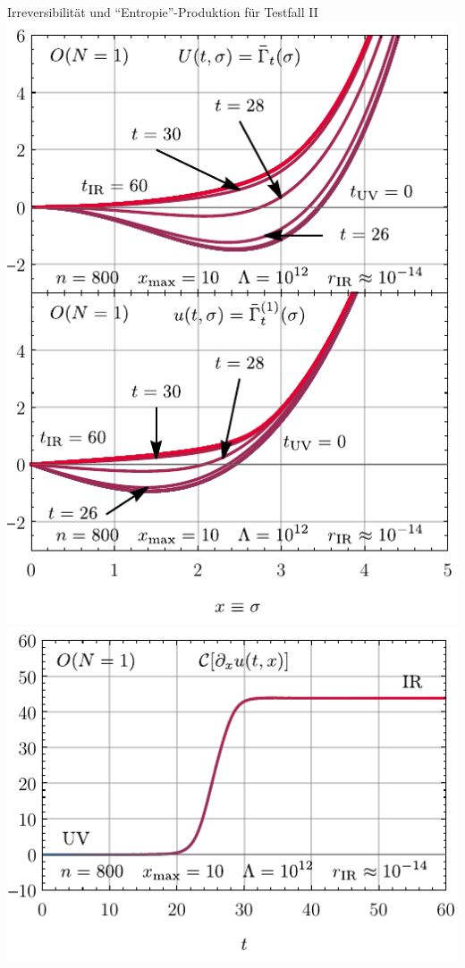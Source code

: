 \begin{frame}{Irreversibilität und ``Entropie''-Produktion für Testfall II}
	\centering
	\includegraphics[width=0.47\framewidth]{../0d/figures/sc_ii_n_on=1_n=800_xmax=10_lambda=1.0e12_tir=60_rg_flow.pdf}\hspace{.5cm}
	\includegraphics[width=0.47\framewidth]{../0d/figures/sc_ii_n_on=1_n=800_xmax=10_lambda=1.0e12_tir=60_entropy_flow.pdf} 
\end{frame}


